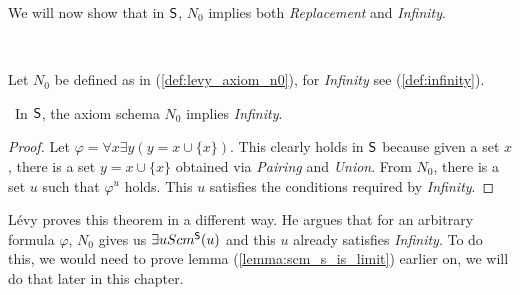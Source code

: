 We will now show that in $\sf{S}$, $N_0$ implies both \emph{Replacement} and \emph{Infinity}.

\

Let $N_0$ be defined as in (\ref{def:levy_axiom_n0}), for \emph{Infinity} see (\ref{def:infinity}).
\begin{theorem}\label{theorem:n0_implies_infinity}\
In $\sf{S}$, the axiom schema $N_0$ implies \emph{Infinity}.
\end{theorem}

\begin{proof} %
Let $\varphi = \forall x \exists y (y = x \cup \{x\})$. 
This clearly holds in $\sf{S}$ because given a set $x$, there is a set $y = x \cup \{x\}$ obtained via \emph{Pairing} and \emph{Union}. %
From $N_0$, there is a set $u$ such that $\varphi^{u}$ holds. %
 This $u$ satisfies the conditions required by \emph{Infinity}.
\end{proof}

Lévy proves this theorem in a different way. He argues that for an arbitrary formula $\varphi$, $N_0$ gives us $\exists u Scm^{\sf{S}}(u)$ and this $u$ already satisfies \emph{Infinity}. 
To do this, we would need to prove lemma (\ref{lemma:scm_s_is_limit}) earlier on, we will do that later in this chapter.

\

